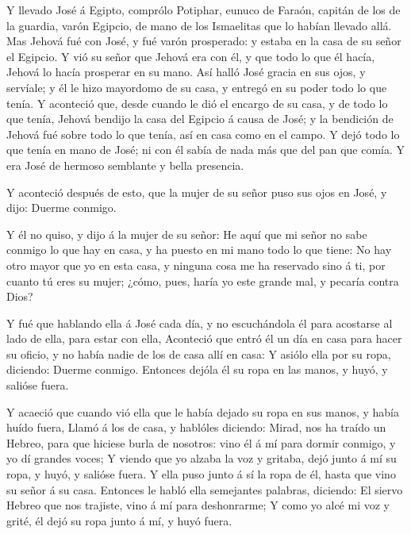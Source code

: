  Y llevado José á Egipto, comprólo Potiphar, eunuco de
Faraón, capitán de los de la guardia, varón Egipcio, de mano de los
Ismaelitas que lo habían llevado allá.  Mas Jehová fué con
José, y fué varón prosperado: y estaba en la casa de su señor el
Egipcio.  Y vió su señor que Jehová era con él, y que todo
lo que él hacía, Jehová lo hacía prosperar en su mano.  Así
halló José gracia en sus ojos, y servíale; y él le hizo mayordomo de su
casa, y entregó en su poder todo lo que tenía.  Y aconteció
que, desde cuando le dió el encargo de su casa, y de todo lo que tenía,
Jehová bendijo la casa del Egipcio á causa de José; y la bendición de
Jehová fué sobre todo lo que tenía, así en casa como en el campo.
 Y dejó todo lo que tenía en mano de José; ni con él sabía
de nada más que del pan que comía. Y era José de hermoso semblante y
bella presencia.

 Y aconteció después de esto, que la mujer de su señor puso
sus ojos en José, y dijo: Duerme conmigo.

 Y él no quiso, y dijo á la mujer de su señor: He aquí que
mi señor no sabe conmigo lo que hay en casa, y ha puesto en mi mano todo
lo que tiene:  No hay otro mayor que yo en esta casa, y
ninguna cosa me ha reservado sino á ti, por cuanto tú eres su mujer;
¿cómo, pues, haría yo este grande mal, y pecaría contra Dios?

 Y fué que hablando ella á José cada día, y no escuchándola
él para acostarse al lado de ella, para estar con ella, 
Aconteció que entró él un día en casa para hacer su oficio, y no había
nadie de los de casa allí en casa:  Y asiólo ella por su
ropa, diciendo: Duerme conmigo. Entonces dejóla él su ropa en las manos,
y huyó, y salióse fuera.

 Y acaeció que cuando vió ella que le había dejado su ropa
en sus manos, y había huído fuera,  Llamó á los de casa, y
hablóles diciendo: Mirad, nos ha traído un Hebreo, para que hiciese
burla de nosotros: vino él á mí para dormir conmigo, y yo dí grandes
voces;  Y viendo que yo alzaba la voz y gritaba, dejó junto
á mí su ropa, y huyó, y salióse fuera.  Y ella puso junto á
sí la ropa de él, hasta que vino su señor á su casa. 
Entonces le habló ella semejantes palabras, diciendo: El siervo Hebreo
que nos trajiste, vino á mí para deshonrarme;  Y como yo
alcé mi voz y grité, él dejó su ropa junto á mí, y huyó fuera.

